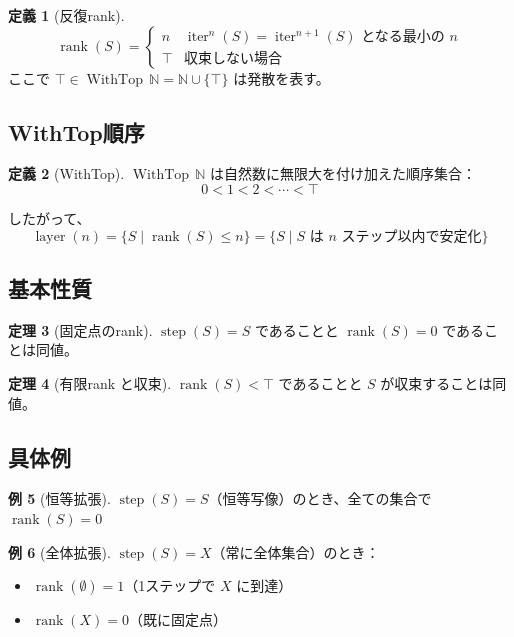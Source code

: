 \documentclass[a4paper,11pt]{ltjsarticle}
\theoremstyle{definition}
\newtheorem{definition}{定義}[section]
\newtheorem{theorem}[definition]{定理}
\newtheorem{example}[definition]{例}
\newcommand{\rank}{\operatorname{rank}}
\newcommand{\layer}{\operatorname{layer}}
\newcommand{\step}{\operatorname{step}}
\newcommand{\iter}{\operatorname{iter}}
\newcommand{\WithTop}{\operatorname{WithTop}}
\begin{document}
\begin{definition}[反復rank]
\label{def:iteration-rank}
\[
\rank(S) = \begin{cases}
n & \text{$\iter^n(S) = \iter^{n+1}(S)$ となる最小の $n$} \\
\top & \text{収束しない場合}
\end{cases}
\]
ここで $\top \in \WithTop\,\mathbb{N} = \mathbb{N} \cup \{\top\}$ は発散を表す。
\end{definition}

\subsection{WithTop順序}

\begin{definition}[WithTop]
$\WithTop\,\mathbb{N}$ は自然数に無限大を付け加えた順序集合：
\[
0 < 1 < 2 < \cdots < \top
\]
\end{definition}

したがって、
\[
\layer(n) = \{ S \mid \rank(S) \leq n \} = \{ S \mid \text{$S$ は $n$ ステップ以内で安定化} \}
\]

\subsection{基本性質}

\begin{theorem}[固定点のrank]
$\step(S) = S$ であることと $\rank(S) = 0$ であることは同値。
\end{theorem}

\begin{theorem}[有限rank と収束]
$\rank(S) < \top$ であることと $S$ が収束することは同値。
\end{theorem}

\subsection{具体例}

\begin{example}[恒等拡張]
$\step(S) = S$（恒等写像）のとき、全ての集合で $\rank(S) = 0$
\end{example}

\begin{example}[全体拡張]
$\step(S) = X$（常に全体集合）のとき：
\begin{itemize}
\item $\rank(\emptyset) = 1$（1ステップで $X$ に到達）
\item $\rank(X) = 0$（既に固定点）
\end{itemize}
\end{example}
\end{document}
